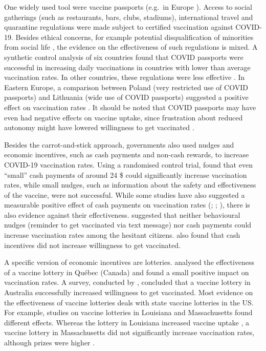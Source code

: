 \documentclass{scrbook}
\begin{document}
One widely used tool were vaccine passports (e.g.~in Europe
\parencite{niestadt_domestic_2021}). Access to social gatherings (such
as restaurants, bars, clubs, stadiums), international travel and
quarantine regulations were made subject to certified vaccination
against COVID-19. Besides ethical concerns, for example potential
disqualification of minorities from social life
\parencite{gostin_digital_2021}, the evidence on the effectiveness of
such regulations is mixed. A synthetic control analysis of six countries
found that COVID passports were successful in increasing daily
vaccinations in countries with lower than average vaccination rates. In
other countries, these regulations were less effective
\parencite{mills_effect_2022}. In Eastern Europe, a comparison between
Poland (very restricted use of COVID passports) and Lithuania (wide use
of COVID passports) suggested a positive effect on vaccination rates
\parencite{walkowiak_covid-19_2021}. It should be noted that COVID
passports may have even had negative effects on vaccine uptake, since
frustration about reduced autonomy might have lowered willingness to get
vaccinated \parencite{porat_vaccine_2021}.

Besides the carrot-and-stick approach, governments also used nudges and
economic incentives, such as cash payments and non-cash rewards, to
increase COVID-19 vaccination rates. Using a randomised control trial,
\textcite{campos-mercade_monetary_2021} found that even ``small'' cash
payments of around 24 \$ could significantly increase vaccination rates,
while small nudges, such as information about the safety and
effectiveness of the vaccine, were not successful. While some studies
have also suggested a measurable positive effect of cash payments on
vaccination rates (\cite{wong_guaranteed_2022};
\cite{kluver_incentives_2021}; \cite{kim_vaccination_2021-1}), there is
also evidence against their effectiveness. \textcite{jacobson_can_2022}
suggested that neither behavioural nudges (reminder to get vaccinated
via text message) nor cash payments could increase vaccination rates
among the hesitant citizens. \textcite{sprengholz_money_2021} also found
that cash incentives did not increase willingness to get vaccinated.

A specific version of economic incentives are lotteries.
\textcite{dube_exploring_2022} analysed the effectiveness of a vaccine
lottery in Québec (Canada) and found a small positive impact on
vaccination rates. A survey, conducted by
\textcite{jun_association_2022}, concluded that a vaccine lottery in
Australia successfully increased willingness to get vaccinated. Most
evidence on the effectiveness of vaccine lotteries deals with state
vaccine lotteries in the US. For example, studies on vaccine lotteries
in Louisiana and Massachusetts found different effects. Whereas the
lottery in Louisiana increased vaccine uptake
\parencite{wang_moving_2023}, a vaccine lottery in Massachusetts did not
significantly increase vaccination rates, although prizes were higher
\parencite{kim_did_2023}.
\end{document}
